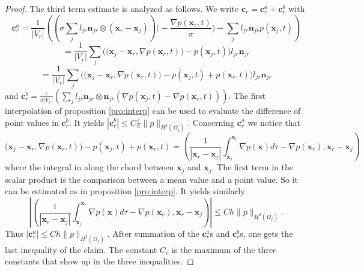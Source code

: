 \documentclass[a4paper,french,english,10pt]{article}
\newcommand\njr{\mathbf{n}_{jr}}
\newcommand\eps{\varepsilon}
\newcommand\x{\mathbf{x}}
\newcommand\xj{\mathbf{x}_j}
\newcommand\xr{\mathbf{x}_r}
\newcommand\cc{\mathbf{c}}
\newcommand\bb{\mathbf{b}}
\newcommand\cj{\cc_j}
\newcommand\ccr{\cc_r}
\newcommand\br{\bb_r}
\begin{document}
\begin{proof}
The third term estimate is analyzed as follows. %
We write  $\ccr=\ccr^a+\ccr^b$  with
$$
\ccr^a = 
\frac1{\vert V_r \vert}\left(  \left( \sigma \sum_j l_{jr}\njr\otimes
\left(\xr - \xj    \right)  \right)  
 \bigg(-\frac{\nabla p (\xr,t)}{\sigma}\bigg) -   \sum_j  l_{jr}\njr
p(\xj,t)\right)
$$
$$
= \frac1{\vert V_r \vert} \sum_j  
\bigg(
  \big( \xj - \xr  , \nabla p (\xr,t)   \big)  
  -    p(\xj,t)  
\bigg)
l_{jr}\njr
$$
$$
= \frac1{\vert V_r \vert} \sum_j  
\bigg(
  \big( \xj - \xr  , \nabla p (\xr,t)   \big)  
  -    p(\xj,t)  + p(\xr,t)
\bigg)
l_{jr}\njr
$$
and 
$
\ccr^b = 
\frac\eps{\sigma \vert V_r \vert} \left(  \sum_j l_{jr}\njr\otimes \njr \left( \nabla p
(\xj,t)  - \nabla p (\xr,t)\right )\right )
$. 
The first  interpolation of proposition \ref{pro:interp} can be used to evaluate the 
difference of point values in $ \ccr^b$. It yields
$
| \ccr^b | \leq C \frac \varepsilon h \| p \|_{H^3(\Omega_j)} $. 
Concerning $\ccr^a$ we notice that
$$
 \big( \xj - \xr  , \nabla p (\xr,t)   \big)  
  -    p(\xj,t)  + p(\xr,t)=
\left(   \frac1{|\x_r -\x_j  |} 
\int_{\xj}^{\xr}  \nabla p (\mathbf x)  d\tau-  \nabla p(\xr) 
, \xr -\xj
\right)
$$
where the integral in along the chord between $\xj$ and $\xj$.
The first term in the scalar product is the comparison between a mean value and a point value. So it can be estimated as in proposition \ref{pro:interp}. It yields similarly
\begin{equation} \label{eq:cch1}
\left| 
 \left(   \frac1{|\x_r -\x_j  |} 
\int_{\xj}^{\xr}  \nabla p (\mathbf x)  d\tau-  \nabla p(\xr) 
, \xr -\xj
\right)
\right| \leq C h \| p \|_{H^3(\Omega_j)}.
\end{equation}
Thus
$
| \ccr^a | \leq {C h }\| p \|_{H^3(\Omega_j)}$.
After summation of the $\ccr^a$s and $\ccr^b$s, one gets
the last inequality of the claim. The constant  $C_c$ is the maximum of the three
constants that show up in the three inequalities.
%
\end{proof}

\end{document}

